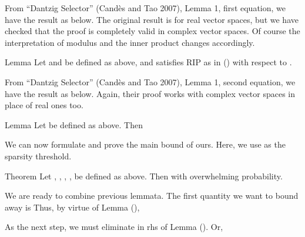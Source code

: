 From ``Dantzig Selector'' (Cand\`es and Tao 2007), Lemma 1, first equation, we have the result as below.
The original result is for real vector spaces, but we have checked that the proof is completely valid in complex vector spaces.
Of course the interpretation of modulus and the inner product changes accordingly.

\Result
{Lemma}
{
Let  and  be defined as above, and  satisfies RIP as in () with respect to .
}

From ``Dantzig Selector'' (Cand\`es and Tao 2007), Lemma 1, second equation, we have the result as below.
Again, their proof works with complex vector spaces in place of real ones too.

\Result
{Lemma}
{
Let  be defined as above.
Then
}

\startsection [title={The Main Bound}]

We can now formulate and prove the main bound of ours.
Here, we use  as the sparsity threshold.

\Result
{Theorem}
{
Let , , , ,  be defined as above.
Then
with overwhelming probability.
}

We are ready to combine previous lemmata.
The first quantity we want to bound away is
Thus, by virtue of Lemma (),

As the next step, we must eliminate  in rhs of Lemma ().
Or,

